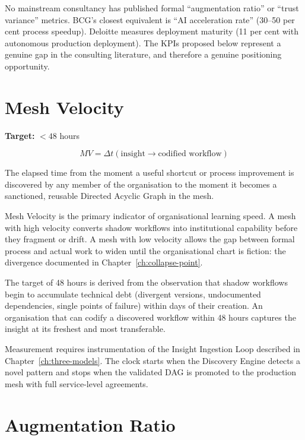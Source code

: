 \begin{keyinsight}
No mainstream consultancy has published formal ``augmentation ratio'' or ``trust variance'' metrics. BCG's closest equivalent is ``AI acceleration rate'' (30--50 per cent process speedup). Deloitte measures deployment maturity (11 per cent with autonomous production deployment). The KPIs proposed below represent a genuine gap in the consulting literature, and therefore a genuine positioning opportunity.
\end{keyinsight}

\section{Mesh Velocity}

\begin{definitionbox}[title={Mesh Velocity (MV)}]
\textbf{Target:} $< 48$ hours

\[
MV = \Delta t \left( \text{insight} \rightarrow \text{codified workflow} \right)
\]

The elapsed time from the moment a useful shortcut or process improvement is discovered by any member of the organisation to the moment it becomes a sanctioned, reusable Directed Acyclic Graph in the mesh.
\end{definitionbox}

Mesh Velocity is the primary indicator of organisational learning speed. A mesh with high velocity converts shadow workflows into institutional capability before they fragment or drift. A mesh with low velocity allows the gap between formal process and actual work to widen until the organisational chart is fiction: the divergence documented in Chapter~\ref{ch:collapse-point}.

The target of 48 hours is derived from the observation that shadow workflows begin to accumulate technical debt (divergent versions, undocumented dependencies, single points of failure) within days of their creation. An organisation that can codify a discovered workflow within 48 hours captures the insight at its freshest and most transferable.

Measurement requires instrumentation of the Insight Ingestion Loop described in Chapter~\ref{ch:three-models}. The clock starts when the Discovery Engine detects a novel pattern and stops when the validated DAG is promoted to the production mesh with full service-level agreements.

\section{Augmentation Ratio}

